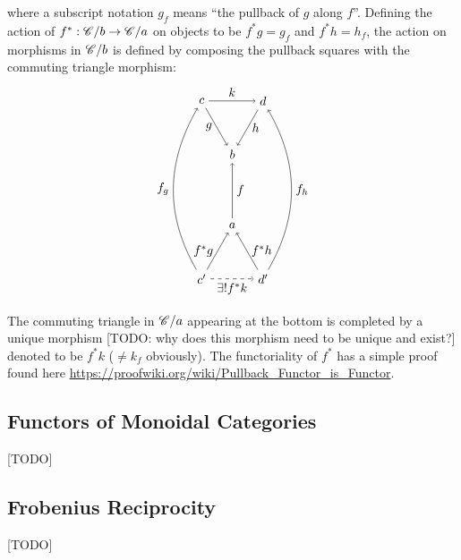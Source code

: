 \documentclass[10pt]{article}
\theoremstyle{definition}
\theoremstyle{remark}
\begin{document}
where a subscript notation $g_{f}$ means ``the pullback of $g$ along $f$''. Defining the action of $f^{\ast} : \mathscr{C} / b \to \mathscr{C} / a$ on objects to be $f^{\ast}g = g_{f}$ and $f^{\ast}h = h_{f}$, the action on morphisms in $\mathscr{C} / b$ is defined by composing the pullback squares with the commuting triangle morphism:
\[
    \begin{tikzpicture}
        \begin{scope}[shift={(0,+2)}]
            \draw (150:1) node(t1){$c$};
            \draw ( 30:1) node(t2){$d$};
            \draw (270:1) node(t3){$b$};

            \draw[->] (t1) to node[below,left ]{$g$}  (t3);
            \draw[->] (t2) to node[below,right]{$h$} (t3);
            \draw[->] (t1) to node[above]{$k$} (t2);
        \end{scope}

        \begin{scope}[shift={(0,-2)}]
            \draw (210:1) node(b1){$c'$};
            \draw (330:1) node(b2){$d'$};
            \draw ( 90:1) node(b3){$a$};

            \draw[->] (b1) to node[below,left ]{$f^{\ast}g$} (b3);
            \draw[->] (b2) to node[below,right]{$f^{\ast}h$} (b3);
            \draw[dashed, ->] (b1) to node[below]{$\exists! f^{\ast}k$} (b2);
        \end{scope}
        \draw[->] (b1) to[out=+120, in=-120] node[left ]{$f_{g}$} (t1);
        \draw[->] (b2) to[out=+ 60, in=- 60] node[right]{$f_{h}$} (t2);
        \draw[->] (b3) to node[right]{$f$} (t3);
    \end{tikzpicture}
\]
The commuting triangle in $\mathscr{C} / a$ appearing at the bottom is completed by a unique morphism \textcolor{red!50!black}{[TODO: why does this morphism need to be unique and exist?]} denoted to be $f^{\ast}k$ ($\neq k_{f}$ obviously). The functoriality of $f^{\ast}$ has a simple proof found here \url{https://proofwiki.org/wiki/Pullback_Functor_is_Functor}.

\subsection{Functors of Monoidal Categories}

\textcolor{red!50!black}{[TODO]}

\subsection{Frobenius Reciprocity}

\textcolor{red!50!black}{[TODO]}



\printbibliography
\end{document}
